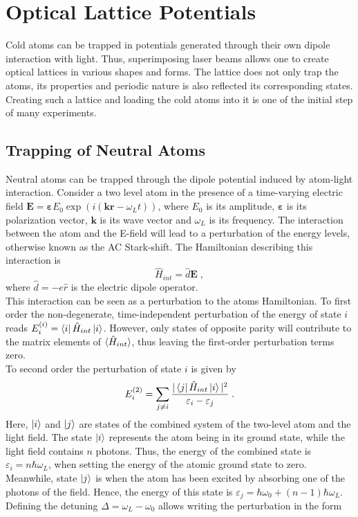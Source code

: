 \chapter{Optical Lattice Potentials}
Cold atoms can be trapped in potentials generated through their own dipole interaction with light. Thus, superimposing laser beams allows one to create optical lattices in various shapes and forms. The lattice does not only trap the atoms, its properties and periodic nature is also reflected its corresponding states. Creating such a lattice and loading the cold atoms into it is one of the initial step of many experiments. 

\section{Trapping of Neutral Atoms}
Neutral atoms can be trapped through the dipole potential induced by atom-light interaction. Consider a two level atom in the presence of a time-varying electric field $\boldsymbol{E} = \boldsymbol{\varepsilon} E_0 \exp{ \left( i(\boldsymbol{k} \boldsymbol{r} - \omega_L t) \right)}$, where $E_0$ is its amplitude, $\boldsymbol{\varepsilon}$ is its polarization vector, $\boldsymbol{k}$ is its wave vector and $\omega_L$ is its frequency. The interaction between the atom and the E-field will lead to a perturbation of the energy levels, otherwise known as the AC Stark-shift. The Hamiltonian describing this interaction is
\begin{equation}
	\hat{H}_{int} = \hat{d} \boldsymbol{E} \; ,
\end{equation}
where $\hat{d} = -e \hat{r}$ is the electric dipole operator.\\
This interaction can be seen as a perturbation to the atoms Hamiltonian. To first order the non-degenerate, time-independent perturbation of the energy of state $i$ reads $E_{i}^{(i)} = \bra{i} \hat{H}_{int} \ket{i}$. However, only states of opposite parity will contribute to the matrix elements of $\braket{\hat{H}_{int}}$, thus leaving the first-order perturbation terms zero.\\
To second order the perturbation of state $i$ is given by
\begin{equation}
	E_i^{(2)} = \sum_{j \neq i} \frac{ |\bra{j} \hat{H}_{int}\ket{i}|^2}{\varepsilon_i - \varepsilon_j} \; .
\end{equation}
Here, $\ket{i}$ and $\ket{j}$ are states of the combined system of the two-level atom and the light field. The state $\ket{i}$ represents the atom being in its ground state, while the light field contains $n$ photons. Thus, the energy of the combined state is $\varepsilon_i = n \hbar \omega_L$, when setting the energy of the atomic ground state to zero. Meanwhile, state $\ket{j}$ is when the atom has been excited by absorbing one of the photons of the field. Hence, the energy of this state is $\varepsilon_j = \hbar \omega_0 + (n-1) \hbar \omega_L$. Defining the detuning $\Delta = \omega_L - \omega_0$ allows writing the perturbation in the form
